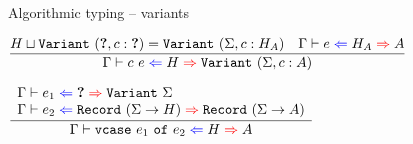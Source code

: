 \documentclass{beamer}
\begin{document}
\begin{frame}{Algorithmic typing -- variants}

\begin{center}
  $\infrule{\sidecond{\hintlub{H}{\Variant{(\extendsig{\Hole}{c}{\Hole})}} = \Variant{(\extendsig{\Sigma}{c}{H_A})}} \quad \hinting{e}{H_A}{A}}{\hinting{\cons{c}{e}}{H}{\Variant{(\extendsig{\Sigma}{c}{A})}}}$

  \vspace{2em}

  $\infrule{\begin{array}{l} \hinting{e_1}{\Hole}{\Variant{\Sigma}} \\ \hinting{e_2}{\Record{(\funsig{\Sigma}{H})}}{\Record{(\funsig{\Sigma}{A})}} \end{array}}{\hinting{\vcase{e_1}{e_2}}{H}{A}}$
\end{center}

\end{frame}
\end{document}
